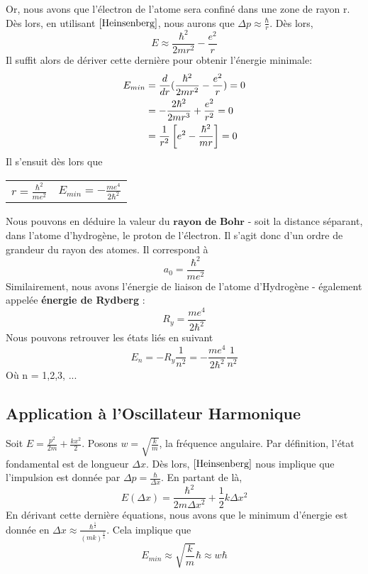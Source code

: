 \documentclass[../Notes de cours]{subfiles}
\begin{document}
Or, nous avons que l'électron de l'atome sera confiné dans une zone de rayon r. Dès lors, en utilisant $\ref{Heinsenberg}$, nous aurons que $\Delta p \approx \frac{\hbar}{r}$. Dès lors,
\begin{equation}
E \approx \frac{\hbar^2}{2mr^2} - \frac{e^2}{r}
\end{equation}
Il suffit alors de dériver cette dernière pour obtenir l'énergie minimale:
\begin{align*}
E_{min} &= \frac{d}{dr} (\frac{\hbar^2}{2mr^2} - \frac{e^2}{r}) = 0\\
&= - \frac{2 \hbar^2}{2mr^3} + \frac{e^2}{r^2} = 0\\
&= \frac{1}{r^2} \left[e^2 - \frac{\hbar^2}{mr} \right] = 0
\end{align*}
Il s'ensuit dès lors que 
\begin{center}
\begin{tabular}{c c}
$r = \frac{\hbar^2}{me^2}$ & $E_{min} = - \frac{me^4}{2 \hbar^2}$
\end{tabular}
\end{center}
Nous pouvons en déduire la valeur du $\textbf{rayon de Bohr}$ - soit la distance séparant, dans l'atome d'hydrogène, le proton de l'électron. Il s'agit donc d'un ordre de grandeur du rayon des atomes. Il correspond à 
\begin{equation}
\label{Rayon de Bohr}
a_0 = \frac{\hbar^2}{me^2}
\end{equation}
Similairement, nous avons l'énergie de liaison de l'atome d'Hydrogène - également appelée \textbf{énergie de Rydberg} :
\begin{equation}
R_y = \frac{me^4}{2 \hbar^2}
\end{equation}
Nous pouvons retrouver les états liés en suivant
\begin{equation}
\label{Etats liés}
E_n = - R_y \frac{1}{n^2} = - \frac{me^4}{2 \hbar^2} \frac{1}{n^2}
\end{equation}
Où n = 1,2,3, ...

\subsection{Application à l'Oscillateur Harmonique}
\label{Application à l'Oscillateur Harmonique}
Soit $E = \frac{p^2}{2m} + \frac{kx^2}{2}$. Posons $w = \sqrt{\frac{k}{m}}$, la fréquence angulaire. Par définition, l'état fondamental est de longueur $\Delta x$. Dès lors, $\ref{Heinsenberg}$ nous implique que l'impulsion est donnée par $\Delta p = \frac{\hbar}{\Delta x}$. En partant de là,
\begin{equation}
E \left(\Delta x \right) = \frac{\hbar^2}{2m\Delta x^2} + \frac{1}{2} k \Delta x^2
\end{equation}
En dérivant cette dernière équations, nous avons que le minimum d'énergie est donnée en $\Delta x \approx \frac{\hbar^{\frac{1}{2}}}{\left(mk\right)^{\frac{1}{4}}}$. Cela implique que
\begin{equation}
\label{Energie OH}
E_{min} \approx \sqrt{\frac{k}{m}} \hbar \approx w \hbar
\end{equation}
\end{document}
